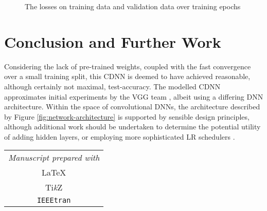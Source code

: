 \documentclass[journal]{IEEEtran}
\begin{document}
\begin{figure}
    \caption{The losses on training data and validation data over training
        epochs}%
    \label{fig:loss-plot}
\end{figure}

\section{Conclusion and Further Work}
Considering the lack of pre-trained weights, coupled with the fast convergence
over a small training split, this CDNN is deemed to have achieved reasonable,
although certainly not maximal, test-accuracy. The modelled CDNN approximates
initial experiments by the VGG team \cite{Nilsback:2008}, albeit using a
differing DNN architecture. Within the space of convolutional DNNs, the
architecture described by Figure \ref{fig:network-architecture} is supported by
sensible design principles, although additional work should be undertaken to
determine the potential utility of adding hidden layers, or employing more
sophisticated LR schedulers \cite{Loshchilov:2017}.



\vfill
\begin{center}
    \color{gray}%
    \begin{tabular}{c}
        \emph{Manuscript prepared with} \\[8pt]
        \huge\LaTeX \\[8pt]
        \huge Ti\textit{k}Z\\[8pt]
        \huge\texttt{IEEEtran}
    \end{tabular}
\end{center}
\end{document}
